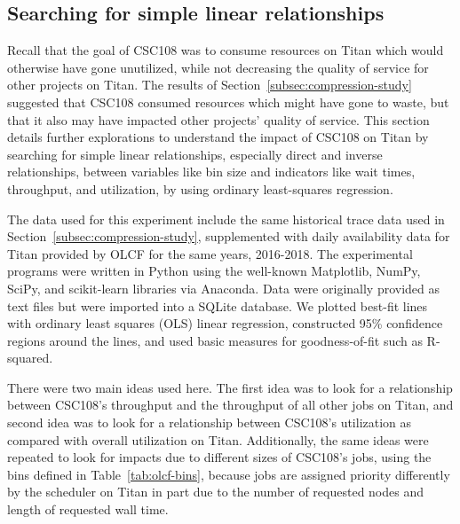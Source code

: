 \subsection{Searching for simple linear relationships}
\label{subsec:simple-linear-relationships}



Recall that the goal of CSC108 was to consume resources on Titan which would
otherwise have gone unutilized, while not decreasing the quality of service for
other projects on Titan. The results of Section~\ref{subsec:compression-study}
suggested that CSC108 consumed resources which might have gone to waste, but
that it also may have impacted other projects' quality of service. This section
details further explorations to understand the impact of CSC108 on Titan by
searching for simple linear relationships, especially direct and inverse
relationships, between variables like bin size and indicators like wait times,
throughput, and utilization, by using ordinary least-squares regression.

The data used for this experiment include the same historical trace data used
in Section~\ref{subsec:compression-study}, supplemented with daily availability
data for Titan provided by OLCF for the same years, 2016-2018. The experimental
programs were written in Python using the well-known Matplotlib, NumPy, SciPy,
and scikit-learn libraries via Anaconda. Data were originally provided as text
files but were imported into a SQLite database. We plotted best-fit lines with
ordinary least squares (OLS) linear regression, constructed 95\% confidence
regions around the lines, and used basic measures for goodness-of-fit such as
R-squared.

There were two main ideas used here. The first idea was to look for a
relationship between CSC108's throughput and the throughput of all other jobs
on Titan, and second idea was to look for a relationship between CSC108's
utilization as compared with overall utilization on Titan. Additionally, the
same ideas were repeated to look for impacts due to different sizes of CSC108's
jobs, using the bins defined in Table~\ref{tab:olcf-bins}, because jobs are
assigned priority differently by the scheduler on Titan in part due to the
number of requested nodes and length of requested wall time.

